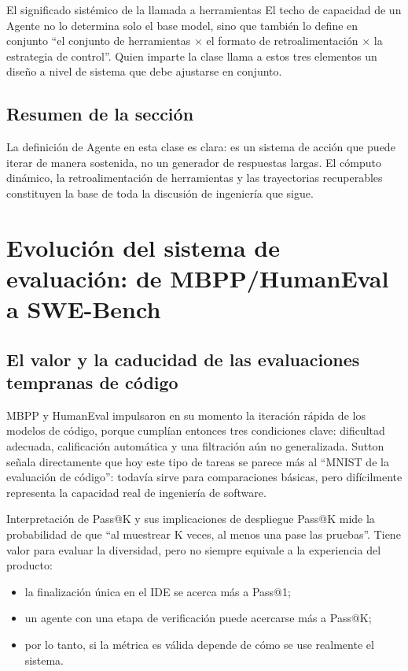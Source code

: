 \documentclass[a4paper]{article}
\begin{document}
\begin{importantbox}{El significado sistémico de la llamada a herramientas}
El techo de capacidad de un Agente no lo determina solo el base model, sino que también lo define en conjunto ``el conjunto de herramientas $\times$ el formato de retroalimentación $\times$ la estrategia de control''. Quien imparte la clase llama a estos tres elementos un diseño a nivel de sistema que debe ajustarse en conjunto.
\end{importantbox}

\subsection{Resumen de la sección}
La definición de Agente en esta clase es clara: es un sistema de acción que puede iterar de manera sostenida, no un generador de respuestas largas. El cómputo dinámico, la retroalimentación de herramientas y las trayectorias recuperables constituyen la base de toda la discusión de ingeniería que sigue.

\section{Evolución del sistema de evaluación: de MBPP/HumanEval a SWE-Bench}

\subsection{El valor y la caducidad de las evaluaciones tempranas de código}
MBPP y HumanEval impulsaron en su momento la iteración rápida de los modelos de código, porque cumplían entonces tres condiciones clave: dificultad adecuada, calificación automática y una filtración aún no generalizada. Sutton señala directamente que hoy este tipo de tareas se parece más al ``MNIST de la evaluación de código'': todavía sirve para comparaciones básicas, pero difícilmente representa la capacidad real de ingeniería de software.

\begin{knowledgebox}{Interpretación de Pass@K y sus implicaciones de despliegue}
Pass@K mide la probabilidad de que ``al muestrear K veces, al menos una pase las pruebas''. Tiene valor para evaluar la diversidad, pero no siempre equivale a la experiencia del producto:
\begin{itemize}
    \item la finalización única en el IDE se acerca más a Pass@1;
    \item un agente con una etapa de verificación puede acercarse más a Pass@K;
    \item por lo tanto, si la métrica es válida depende de cómo se use realmente el sistema.
\end{itemize}
\end{knowledgebox}
\end{document}
